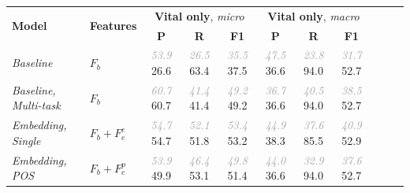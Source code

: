 \documentclass{article}
\newcommand{\sub}[1]{\textcolor{darkgray}{\sl #1}}
\begin{document}
\begin{table}[tb]
{\small
\begin{center}
\begin{tabular}{llccccccccc} 
\toprule
  \multirow{2}{*}{\textbf{Model}} & 
  \multirow{2}{*}{\textbf{Features}} & 
  \multicolumn{3}{c}{\textbf{Vital only}, \emph{micro}} &
  \multicolumn{3}{c}{\textbf{Vital only}, \emph{macro}}
\\ 
  \cmidrule(lr){3-5}
  \cmidrule(lr){6-8}
&   & 
  \textbf{P} & \textbf{R} & \textbf{F1} & 
  \textbf{P} & \textbf{R} & \textbf{F1} \\ 
\midrule
{\textit{Baseline}} & $F_b$ &
  \sub{53.9}  \hspace{1mm} 26.6 & \sub{26.5} \hspace{1mm} 63.4 & \sub{35.5} \hspace{1mm} 37.5 &
  \sub{47.5}  \hspace{1mm} 36.6 & \sub{23.8} \hspace{1mm} 94.0 & \sub{31.7} \hspace{1mm} 52.7 \\
{\textit{Baseline, Multi-task}} & $F_b$ &
  \sub{60.7} \hspace{1mm} 60.7 & \sub{41.4} \hspace{1mm} 41.4 & \sub{49.2} \hspace{1mm} 49.2 &
  \sub{36.7} \hspace{1mm} 36.6 & \sub{40.5} \hspace{1mm} 94.0 & \sub{38.5} \hspace{1mm} 52.7 \\
{\textit{Embedding, Single}} & $F_b+F_e^c$ & 
  \sub{54.7} \hspace{1mm} 54.7 & \sub{52.1} \hspace{1mm} 51.8 & \sub{53.4} \hspace{1mm} 53.2 &
  \sub{44.9} \hspace{1mm} 38.3 & \sub{37.6} \hspace{1mm} 85.5 & \sub{40.9} \hspace{1mm} 52.9 \\
{\textit{Embedding, POS}} & $F_b+F_e^p$ & 
  \sub{53.9} \hspace{1mm} 49.9 & \sub{46.4} \hspace{1mm} 53.1 & \sub{49.8} \hspace{1mm} 51.4 &
  \sub{44.0} \hspace{1mm} 36.6 & \sub{32.9} \hspace{1mm} 94.0 & \sub{37.6} \hspace{1mm} 52.7 \\

\end{tabular}
\end{center}}
\end{table}
\end{document}

